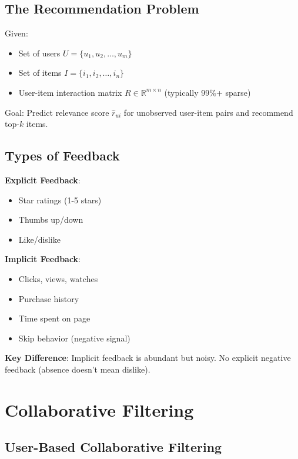 \documentclass[10pt]{article}
\begin{document}
\subsection{The Recommendation Problem}

Given:
\begin{itemize}[leftmargin=*]
    \item Set of users $U = \{u_1, u_2, \ldots, u_m\}$
    \item Set of items $I = \{i_1, i_2, \ldots, i_n\}$
    \item User-item interaction matrix $R \in \mathbb{R}^{m \times n}$ (typically 99\%+ sparse)
\end{itemize}

Goal: Predict relevance score $\hat{r}_{ui}$ for unobserved user-item pairs and recommend top-$k$ items.

\subsection{Types of Feedback}

\textbf{Explicit Feedback}:
\begin{itemize}[leftmargin=*]
    \item Star ratings (1-5 stars)
    \item Thumbs up/down
    \item Like/dislike
\end{itemize}

\textbf{Implicit Feedback}:
\begin{itemize}[leftmargin=*]
    \item Clicks, views, watches
    \item Purchase history
    \item Time spent on page
    \item Skip behavior (negative signal)
\end{itemize}

\textbf{Key Difference}: Implicit feedback is abundant but noisy. No explicit negative feedback (absence doesn't mean dislike).

\section{Collaborative Filtering}

\subsection{User-Based Collaborative Filtering}
\end{document}
